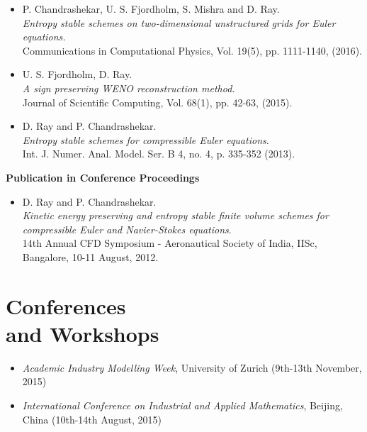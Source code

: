\documentclass[margin]{res}
\begin{document}
\begin{resume}
\begin{itemize}
              \item P. Chandrashekar, U. S. Fjordholm, S. Mishra and D. Ray. \\
              {\it Entropy stable schemes on two-dimensional unstructured grids for Euler equations.}\\
              Communications in Computational Physics, Vol. 19(5), pp. 1111-1140, (2016).
            
              \item U. S. Fjordholm, D. Ray. \\
              {\it A sign preserving WENO reconstruction method.}\\
              Journal of Scientific Computing, Vol. 68(1), pp. 42-63, (2015).
             
              \item D. Ray and P. Chandrashekar.\\
              {\it Entropy stable schemes for compressible Euler equations}.\\
              Int. J. Numer. Anal. Model. Ser. B 4, no. 4, p. 335-352 (2013).
             \end{itemize}


\textbf{Publication in Conference Proceedings}                
            \begin{itemize}           
              
              \item D. Ray and P. Chandrashekar.\\
              {\it Kinetic energy preserving and entropy stable finite volume schemes for compressible Euler and Navier-Stokes equations}.\\
              14th Annual CFD Symposium - Aeronautical Society of India, IISc, Bangalore, 10-11 August, 2012.
             \end{itemize}

\section{Conferences \\ and Workshops} 
             \begin{itemize}
             \item {\it Academic Industry Modelling Week}, University of Zurich  (9th-13th November, 2015) 
             
              \item {\it International Conference on Industrial and Applied Mathematics}, Beijing, China  (10th-14th August, 2015) 
              

\end{itemize}
\end{resume}
\end{document}
